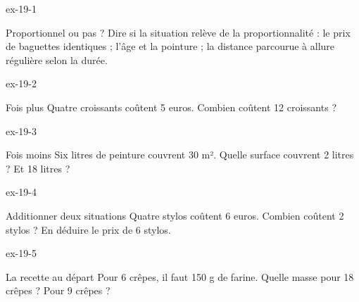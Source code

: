 \clearpage{}
\begin{blocLivre}{ex-19-1}\begin{exercice}[1]{Proportionnel ou pas ?}
Dire si la situation relève de la proportionnalité : le prix de baguettes identiques ; l’âge et la pointure ; la distance parcourue à allure régulière selon la durée.
\end{exercice}\end{blocLivre}
\begin{blocLivre}{ex-19-2}\begin{exercice}[1]{Fois plus}
Quatre croissants coûtent 5 euros. Combien coûtent 12 croissants ?
\end{exercice}\end{blocLivre}
\begin{blocLivre}{ex-19-3}\begin{exercice}[1]{Fois moins}
Six litres de peinture couvrent 30 m². Quelle surface couvrent 2 litres ? Et 18 litres ?
\end{exercice}\end{blocLivre}
\begin{blocLivre}{ex-19-4}\begin{exercice}[1]{Additionner deux situations}
Quatre stylos coûtent 6 euros. Combien coûtent 2 stylos ? En déduire le prix de 6 stylos.
\end{exercice}\end{blocLivre}
\begin{blocLivre}{ex-19-5}\begin{exercice}[1]{La recette au départ}
Pour 6 crêpes, il faut 150 g de farine. Quelle masse pour 18 crêpes ? Pour 9 crêpes ?
\end{exercice}\end{blocLivre}

